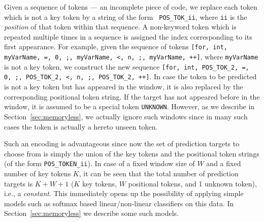 Given a sequence of tokens --- an incomplete piece of code, we replace each
token which is not a key token by a string of the form {\tt
POS\_TOK\_ii}, where {\tt ii} is the {\it position} of that token
within that sequence. A non-keyword token which is repeated multiple times in a
sequence is assigned the index corresponding to its first appearance. For
example, given the sequence of tokens {\tt[for, int, myVarName, =, 0, ;,
myVarName, <, n, ;, myVarName, ++]}, where {\tt myVarName} is not a key token,
we construct the new sequence {\tt[for, int, POS\_TOK\_2, =, 0, ;, POS\_TOK\_2,
<, n, ;, POS\_TOK\_2, ++]}. In case the token to be predicted is not a key token
but has appeared in the window, it is also replaced by the corresponding
positional token string. If the target has not appeared before in the window, it
is assumed to be a special token {\tt UNKNOWN}. However, as we describe in
Section~\ref{sec:memoryless}, we actually ignore such windows since in many such
cases the token is actually a hereto unseen token.

Such an encoding is advantageous since now the set of prediction targets to
choose from is simply the union of the key tokens and the positional token
strings (of the form {\tt POS\_TOKEN\_ii}). In case of a fixed window size of
$W$ and a fixed number of key tokens $K$, it can be seen that the total number
of prediction targets is $K+W+1$ ($K$ key tokens, $W$ positional tokens, and 1
unknown token), i.e., a {\it constant}. This immediately opens up the
possibility of applying simple models such as softmax based linear/non-linear
classifiers on this data. In Section~\ref{sec:memoryless} we describe some such
models.

%

